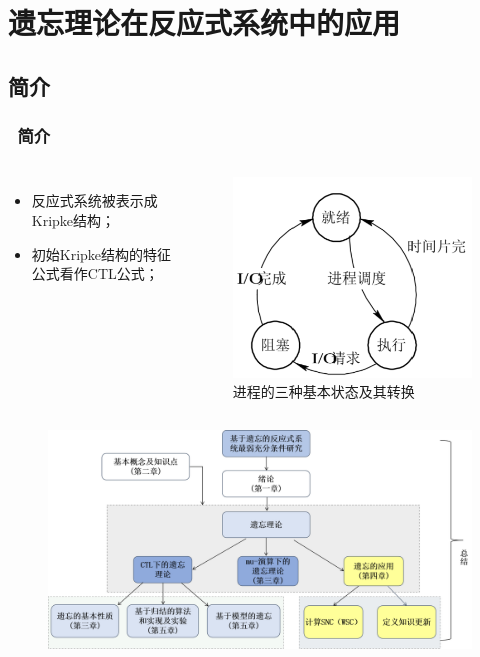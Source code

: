 \documentclass[9pt, CJK]{beamer}
\begin{document}
\section{遗忘理论在反应式系统中的应用}
\subsection{简介}
\begin{frame}
	\frametitle{~简介}
	{\footnotesize
	\begin{columns}
		\begin{itemize}
			\item 反应式系统被表示成Kripke结构；
			\item 初始Kripke结构的特征公式看作CTL公式；
		\end{itemize}
		 \begin{figure}
		 	\includegraphics[scale=0.28]{figures/processState}
		 	\caption{{\scriptsize 进程的三种基本状态及其转换}}
		 \end{figure}
	\end{columns}
}
\begin{figure}
	\includegraphics[scale=0.27]{figures/applicationF4}
\end{figure}
\end{frame}
\end{document}
